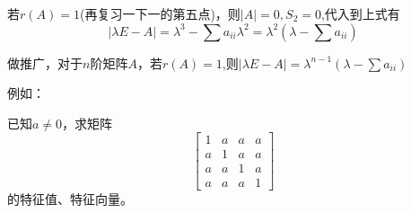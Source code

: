 \documentclass{article}
\begin{document}
若$r(A)=1$(再复习一下一的第五点)，则$|A|=0,S_{2}=0$,代入到上式有
\begin{equation*}
|\lambda E-A|=\lambda^{3}-\sum a_{ii}\lambda^2=\lambda^2\left(\lambda-\sum a_{ii}\right)
\end{equation*}

做推广，对于$n$阶矩阵$A$，若$r(A)=1$,则$|\lambda E-A|=\lambda^{n-1}\left(\lambda-\sum a_{ii}\right)$

例如：

已知$a\neq 0$，求矩阵
\begin{equation*}
  \begin{bmatrix}
    1 & a & a& a\\
    a & 1& a& a\\
    a& a& 1& a\\
    a& a& a& 1
  \end{bmatrix}
\end{equation*}
的特征值、特征向量。
\end{document}
